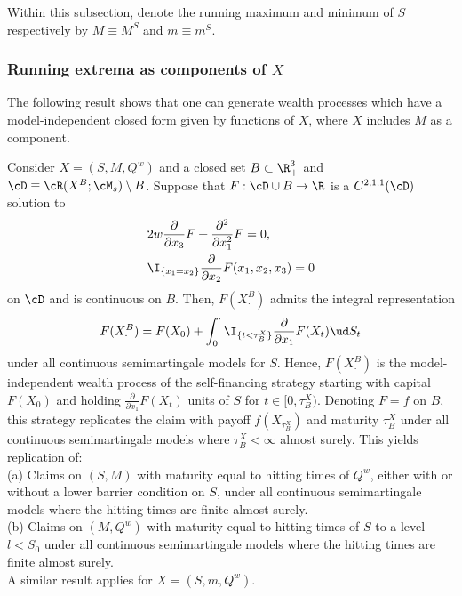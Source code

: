 \documentclass[11pt]{article}
\begin{document}
\begin{notation}
Within this subsection, denote the running maximum and minimum of $S$ respectively by $M \equiv M^S$ and $m \equiv m^S$.
\end{notation}

\subsubsection{Running extrema as components of $X$} 
The following result shows that one can generate wealth processes which have a model-independent closed form given by functions of $X$, where $X$ includes $M$ as a component.

\begin{proposition}
\label{proposition: claims on S, M and Q^w}
Consider $X = (S, M, Q^w)$ and a closed set $B \subset \R_+^3$ and $\cD \equiv \cR(X^B; \cM_s) \setminus B$. Suppose that $F: \cD \cup B \to \R$ is a $C^{2,1,1}(\cD)$ solution to 
\begin{align}
&2 w \frac{\partial}{\partial x_3} F + \frac{\partial^2}{\partial x_1^2} F = 0, \label{running maximum PDE} \\
& \I_{\{ x_1 = x_2 \}}\frac{\partial}{\partial x_2} F(x_1, x_2, x_3) = 0 \label{mixed BC}
\end{align}
on $\cD$ and is continuous on $B$. Then, $F(X^B_\cdot)$ admits the integral representation
$$
F (X^B_\cdot) = F(X_0) + \int_0^\cdot \I_{\{ t < \tau^X_B \}} \frac{\partial}{\partial x_1} F(X_t) \ud S_t
$$
under all continuous semimartingale models for $S$. Hence, $F(X^B_\cdot)$ is the model-independent wealth process of the self-financing strategy starting with capital $F(X_0)$ and holding $\frac{\partial}{\partial x_1} F(X_t)$ units of $S$ for $t \in [0, \tau^X_B)$. Denoting $F = f$ on $B$, this strategy replicates the claim with payoff $f(X_{\tau^X_B})$ and maturity $\tau^X_B$ under all continuous semimartingale models where $\tau^X_B < \infty$ almost surely. This yields replication of: \\
(a) Claims on $(S, M)$ with maturity equal to hitting times of $Q^w$, either with or without a lower barrier condition on $S$, under all continuous semimartingale models where the hitting times are finite almost surely. \\
(b) Claims on $(M,Q^w)$ with maturity equal to hitting times of $S$ to a level $l < S_0$ under all continuous semimartingale models where the hitting times are finite almost surely.  \\
A similar result applies for $X = (S, m, Q^w)$.
\end{proposition}
\end{document}
